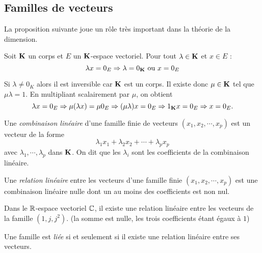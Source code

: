 \subsection{Familles de vecteurs}
La proposition suivante joue un rôle très important dans la théorie de la dimension.
\begin{prop}
 Soit $\mathbf{K}$ un corps et $E$ un $\mathbf{K}$-espace vectoriel. Pour tout $\lambda \in \mathbf{K}$ et $x\in E$ :
\begin{displaymath}
  \lambda x = 0_E \Rightarrow \lambda = 0_{\mathbf{K}} \text{ ou } x=0_E 
\end{displaymath}
\end{prop}
\begin{demo}
 Si $\lambda\neq 0_K$ alors il est inversible car $\mathbf{K}$ est un corps. Il existe donc $\mu \in \mathbf{K}$ tel que $\mu \lambda =1$. En multipliant scalairement par $\mu$, on obtient
\begin{displaymath}
 \lambda x = 0_E \Rightarrow \mu(\lambda x )= \mu 0_E \Rightarrow (\mu \lambda)x = 0_E
\Rightarrow 1_{\mathbf{K}} x =0_E \Rightarrow x= 0_E.
\end{displaymath}
\end{demo}
\begin{defi}
 Une \emph{combinaison linéaire} d'une famille finie de vecteurs $(x_1,x_2,\cdots,x_p)$ est un vecteur de la forme
\begin{displaymath}
 \lambda_1x_1 + \lambda_2x_2 + \cdots + \lambda_p x_p 
\end{displaymath}
avec $\lambda_1,\cdots,\lambda_p$ dans $\mathbf{K}$. On dit que les $\lambda_i$ sont les coefficients de la combinaison linéaire.
\end{defi}

\begin{defi}
 Une \emph{relation linéaire} entre les vecteurs d'une famille finie $(x_1,x_2,\cdots,x_p)$ est une combinaison linéaire nulle dont un au moins des coefficients est non nul.
\end{defi}

\begin{exple} Dans le $\mathbb{R}$-espace vectoriel $\mathbb{C}$, il existe une relation linéaire entre les vecteurs de la famille $(1,j,j^2)$. (la somme est nulle, les trois coefficients étant égaux à $1$)
\end{exple}

\begin{defi}
  Une famille est \emph{liée} si et seulement si il existe une relation linéaire entre ses vecteurs. 
\end{defi}

